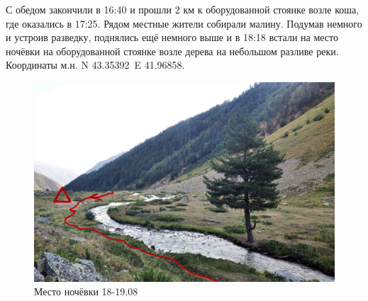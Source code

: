 С обедом закончили в 16:40 и прошли 2 км к оборудованной стоянке возле коша, где оказались в 17:25. Рядом местные жители собирали малину. Подумав немного и устроив разведку, поднялись ещё немного выше и в 18:18 встали на место ночёвки на оборудованной стоянке возле дерева на небольшом разливе реки. Координаты м.н. N 43.35392\degree~E 41.96858\degree.
\begin{figure}[h!]
	\centering
	\includegraphics[width=0.7\linewidth]{../pics/camp_18}
	\caption{Место ночёвки 18-19.08}
	\label{fig:camp_18}
\end{figure}

\clearpage